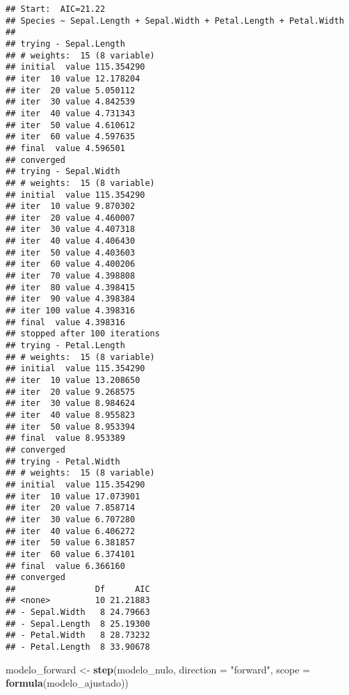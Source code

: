\documentclass[
]{article}
\newenvironment{Shaded}{\begin{snugshade}}{\end{snugshade}}
\newcommand{\AttributeTok}[1]{\textcolor[rgb]{0.13,0.29,0.53}{#1}}
\newcommand{\FunctionTok}[1]{\textcolor[rgb]{0.13,0.29,0.53}{\textbf{#1}}}
\newcommand{\NormalTok}[1]{#1}
\newcommand{\OtherTok}[1]{\textcolor[rgb]{0.56,0.35,0.01}{#1}}
\newcommand{\StringTok}[1]{\textcolor[rgb]{0.31,0.60,0.02}{#1}}
\begin{document}
\begin{verbatim}
## Start:  AIC=21.22
## Species ~ Sepal.Length + Sepal.Width + Petal.Length + Petal.Width
## 
## trying - Sepal.Length 
## # weights:  15 (8 variable)
## initial  value 115.354290 
## iter  10 value 12.178204
## iter  20 value 5.050112
## iter  30 value 4.842539
## iter  40 value 4.731343
## iter  50 value 4.610612
## iter  60 value 4.597635
## final  value 4.596501 
## converged
## trying - Sepal.Width 
## # weights:  15 (8 variable)
## initial  value 115.354290 
## iter  10 value 9.870302
## iter  20 value 4.460007
## iter  30 value 4.407318
## iter  40 value 4.406430
## iter  50 value 4.403603
## iter  60 value 4.400206
## iter  70 value 4.398808
## iter  80 value 4.398415
## iter  90 value 4.398384
## iter 100 value 4.398316
## final  value 4.398316 
## stopped after 100 iterations
## trying - Petal.Length 
## # weights:  15 (8 variable)
## initial  value 115.354290 
## iter  10 value 13.208650
## iter  20 value 9.268575
## iter  30 value 8.984624
## iter  40 value 8.955823
## iter  50 value 8.953394
## final  value 8.953389 
## converged
## trying - Petal.Width 
## # weights:  15 (8 variable)
## initial  value 115.354290 
## iter  10 value 17.073901
## iter  20 value 7.858714
## iter  30 value 6.707280
## iter  40 value 6.406272
## iter  50 value 6.381857
## iter  60 value 6.374101
## final  value 6.366160 
## converged
##                Df      AIC
## <none>         10 21.21883
## - Sepal.Width   8 24.79663
## - Sepal.Length  8 25.19300
## - Petal.Width   8 28.73232
## - Petal.Length  8 33.90678
\end{verbatim}

\begin{Shaded}
\begin{Highlighting}[]
\NormalTok{modelo\_forward }\OtherTok{\textless{}{-}} \FunctionTok{step}\NormalTok{(modelo\_nulo, }\AttributeTok{direction =} \StringTok{"forward"}\NormalTok{, }\AttributeTok{scope =} \FunctionTok{formula}\NormalTok{(modelo\_ajustado))}
\end{Highlighting}
\end{Shaded}
\end{document}
